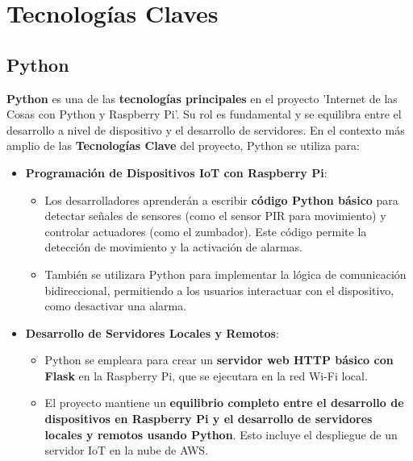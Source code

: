 \documentclass{report}
\begin{document}
\section{Tecnologías Claves}
\subsection{Python}
\textbf{Python} \cite{python} es una de las \textbf{tecnologías principales} en el proyecto  'Internet de las 
Cosas con Python y Raspberry Pi'. Su rol es fundamental y se equilibra entre el desarrollo a nivel de dispositivo y el desarrollo de 
servidores. En el contexto más amplio de las \textbf{Tecnologías Clave} del proyecto, Python se utiliza para:

\begin{itemize}
    \item \textbf{Programación de Dispositivos IoT con Raspberry Pi}:
    \begin{itemize}
        \item Los desarrolladores aprenderán a escribir \textbf{código Python básico} para detectar señales de sensores (como el sensor 
        PIR para movimiento) y controlar actuadores (como el zumbador). Este código permite la detección de movimiento y la activación 
        de alarmas.
        \item También se utilizara Python para implementar la lógica de comunicación bidireccional, permitiendo a los usuarios interactuar 
        con el dispositivo, como desactivar una alarma.
    \end{itemize}

    \item \textbf{Desarrollo de Servidores Locales y Remotos}:
    \begin{itemize}
        \item Python se empleara para crear un \textbf{servidor web HTTP básico con Flask} en la Raspberry Pi, que se ejecutara en la 
        red Wi-Fi local.
        \item El proyecto mantiene un \textbf{equilibrio completo entre el desarrollo de dispositivos en Raspberry Pi y el desarrollo 
        de servidores locales y remotos usando Python}. Esto incluye el despliegue de un servidor IoT en la nube de AWS.
    \end{itemize}


\end{itemize}
\end{document}
